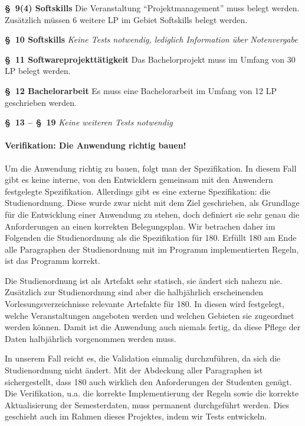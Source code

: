 \documentclass[ngerman]{article}
\begin{document}
\begin{paracol}{2}
\textbf{§~9(4) Softskills}
\switchcolumn
Die Veranstaltung ``Projektmanagement'' muss belegt werden.
Zusätzlich müssen 6 weitere LP im Gebiet Softskills belegt werden.
\\
\switchcolumn*

\textbf{§~10 Softskills}
\switchcolumn
\emph{Keine Tests notwendig, lediglich Information über Notenvergabe}
\\
\switchcolumn*

\textbf{§~11 Softwareprojekttätigkeit}
\switchcolumn
Das Bachelorprojekt muss im Umfang von 30 LP belegt werden.
\\
\switchcolumn*

\textbf{§~12 Bachelorarbeit}
\switchcolumn
Es muss eine Bachelorarbeit im Umfang von 12 LP geschrieben werden.
\\
\switchcolumn*

\textbf{§~13 -- §~19}
\switchcolumn
\emph{Keine weiteren Tests notwendig}
\\
\switchcolumn*
\end{paracol}

\paragraph{Verifikation: Die Anwendung richtig bauen!}

Um die Anwendung richtig zu bauen, folgt man der Spezifikation.
In diesem Fall gibt es keine interne, von den Entwicklern gemeinsam mit den Anwendern festgelegte Spezifikation.
Allerdings gibt es eine externe Spezifikation: die Studienordnung.
Diese wurde zwar nicht mit dem Ziel geschrieben, als Grundlage für die Entwicklung einer Anwendung zu stehen, doch definiert sie sehr genau die Anforderungen an einen korrekten Belegungsplan.
Wir betrachen daher im Folgenden die Studienordnung als die Spezifikation für 180.
Erfüllt 180 am Ende alle Paragraphen der Studienordnung mit im Programm implementierten Regeln, ist das Programm korrekt.

Die Studienordnung ist als Artefakt sehr statisch, sie ändert sich nahezu nie.
Zusätzlich zur Studienordnung sind aber die halbjährlich erscheinenden Vorlesungsverzeichnisse relevante Artefakte für 180.
In diesen wird festgelegt, welche Veranstaltungen angeboten werden und welchen Gebieten sie zugeordnet werden können.
Damit ist die Anwendung auch niemals fertig, da diese Pflege der Daten halbjährlich vorgenommen werden muss.

In unserem Fall reicht es, die Validation einmalig durchzuführen, da sich die Studienordnung nicht ändert.
Mit der Abdeckung aller Paragraphen ist sichergestellt, dass 180 auch wirklich den Anforderungen der Studenten genügt.
Die Verifikation, u.a. die korrekte Implementierung der Regeln sowie die korrekte Aktualisierung der Semesterdaten, muss permanent durchgeführt werden.
Dies geschieht auch im Rahmen dieses Projektes, indem wir Tests entwickeln.
\end{document}
